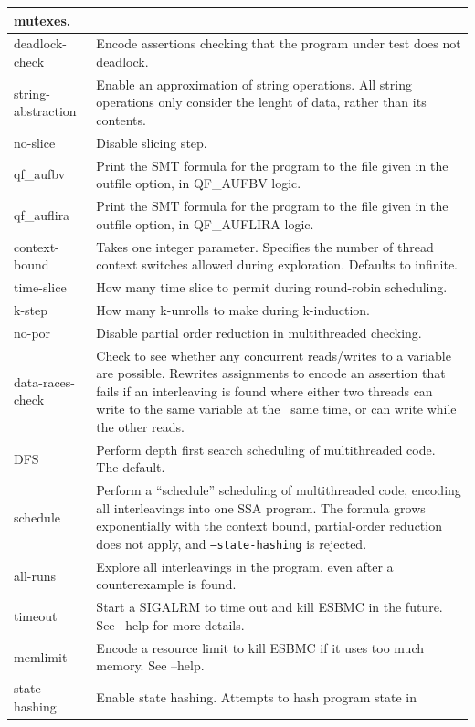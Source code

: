 \documentclass{article}
\begin{document}
\begin{longtable}{| p{} | p{} |}
mutexes.\\
\hline
deadlock-check & Encode assertions checking that the program under test does not
deadlock.\\
\hline
string-abstraction & Enable an approximation of string operations. All string
operations only consider the lenght of data, rather than its contents.\\
\hline
no-slice & Disable slicing step.\\
\hline
qf\_aufbv & Print the SMT formula for the program to the file given in the
outfile option, in QF\_AUFBV logic.\\
\hline
qf\_auflira & Print the SMT formula for the program to the file given in the
outfile option, in QF\_AUFLIRA logic.\\
\hline
context-bound & Takes one integer parameter. Specifies the number of thread
context switches allowed during exploration. Defaults to infinite.\\
\hline
time-slice & How many time slice to permit during round-robin scheduling.\\
\hline
k-step & How many k-unrolls to make during k-induction.\\
\hline
no-por & Disable partial order reduction in multithreaded checking.\\
\hline
data-races-check & Check to see whether any concurrent reads/writes to a
variable are possible. Rewrites assignments to encode an assertion that fails
if an interleaving is found where either two threads can write to the same
variable at the ~same time, or can write while the other reads.\\
\hline
DFS & Perform depth first search scheduling of multithreaded code. The
default.\\
\hline
schedule & Perform a ``schedule'' scheduling of multithreaded code, encoding
all interleavings into one SSA program. The formula grows exponentially with
the context bound, partial-order reduction does not apply, and
\texttt{--state-hashing} is rejected.\\
\hline
all-runs & Explore all interleavings in the program, even after a counterexample
is found.\\
\hline
timeout & Start a SIGALRM to time out and kill ESBMC in the future. See --help
for more details.\\
\hline
memlimit & Encode a resource limit to kill ESBMC if it uses too much memory.
See --help.\\
\hline
state-hashing & Enable state hashing. Attempts to hash program state in

\end{longtable}
\end{document}
